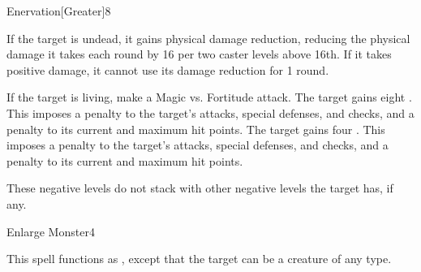 \begin{spellsection}{Enervation}[Greater]{8}
\begin{spellheader}
\end{spellheader}
\begin{spellcontent}
    \begin{spelltargetinginfo}
    \end{spelltargetinginfo}
    \begin{spelleffects}
        \spelleffect If the target is undead, it gains physical damage reduction, reducing the physical damage it takes each round by 16  per two caster levels above 16th. If it takes positive damage, it cannot use its damage reduction for 1 round.
        \begin{spellattacktriggered}{If the target is living, make a Magic vs. Fortitude attack.}
            \spellsuccess The target gains eight . This imposes a  penalty to the target's attacks, special defenses, and checks, and a  penalty to its current and maximum hit points.
            \spellsuccess The target gains four . This imposes a  penalty to the target's attacks, special defenses, and checks, and a  penalty to its current and maximum hit points.
        \end{spellattacktriggered}
    \end{spelleffects}
\end{spellcontent}
\begin{spellfooter}
    \spellnotes These negative levels do not stack with other negative levels the target has, if any.
\end{spellfooter}
\end{spellsection}

\begin{spellsection}{Enlarge Monster}{4}
\begin{spellheader}
\end{spellheader}
\begin{spellcontent}
    \begin{spelltargetinginfo}
    \end{spelltargetinginfo}
    \begin{spelleffects}
        \spellspecial This spell functions as , except that the target can be a creature of any type.
    \end{spelleffects}
\end{spellcontent}
\begin{spellfooter}
    \spellnotes \sizingspellnotes
\end{spellfooter}
\end{spellsection}

